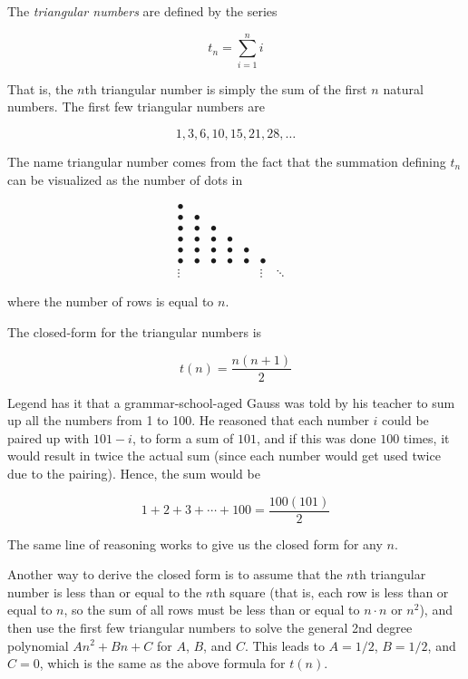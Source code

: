 \documentclass{article}
\begin{document}
The \emph{triangular numbers} are defined by the series

$$ t_n = \sum_{i=1}^n i $$

That is, the $n$th triangular number is simply the sum of the first $n$ natural numbers.  The first few triangular numbers are

$$ 1, 3, 6, 10, 15, 21, 28, \ldots $$

The name triangular number comes from the fact that the summation defining $t_n$ can be visualized as the number of dots in

$$ \begin{matrix}
 \bullet & & & & & & & \\
 \bullet & \bullet & & & & & & \\
 \bullet & \bullet & \bullet & & & & & \\
 \bullet & \bullet & \bullet & \bullet & & &  & \\
 \bullet & \bullet & \bullet & \bullet & \bullet & & & \\
 \bullet & \bullet & \bullet & \bullet & \bullet & \bullet & & \\
 \vdots &  &  &  &  & \vdots & \ddots & 
\end{matrix} $$

where the number of rows is equal to $n$.  

The closed-form for the triangular numbers is 

$$ t(n) = \frac{n(n+1)}{2} $$

Legend has it that a grammar-school-aged Gauss was told by his teacher to sum up all the numbers from 1 to 100.  He reasoned that each number $i$ could be paired up with $101-i$, to form a sum of $101$, and if this was done $100$ times, it would result in twice the actual sum (since each number would get used twice due to the pairing).  Hence, the sum would be 

$$ 1+2+3+\cdots+100 = \frac{100(101)}{2} $$

The same line of reasoning works to give us the closed form for any $n$.

Another way to derive the closed form is to assume that the $n$th triangular number is less than or equal to the $n$th square (that is, each row is less than or equal to $n$, so the sum of all rows must be less than or equal to $n\cdot n$ or $n^2$), and then use the first few triangular numbers to solve the general 2nd degree polynomial $An^2 + Bn + C$ for $A$, $B$, and $C$.  This leads to $A=1/2$, $B=1/2$, and $C=0$, which is the same as the above formula for $t(n)$.
\end{document}
